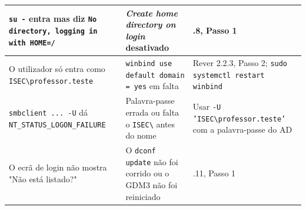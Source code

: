 \begin{center}
\begin{tabularx}{\linewidth}{|>{\raggedright\arraybackslash}X|>{\raggedright\arraybackslash}X|>{\raggedright\arraybackslash}X|}
\hline
\texttt{su -} entra mas diz \texttt{No directory,\allowbreak{} logging in with HOME=/\allowbreak{}} & \emph{Create home directory on login} desativado & 2.2.8, Passo 1 \\
\hline
O utilizador só entra como \texttt{ISEC\textbackslash{}professor.teste} & \texttt{winbind use default domain = yes} em falta & Rever 2.2.3, Passo 2; \texttt{sudo systemctl restart winbind} \\
\hline
\texttt{smbclient ... -U} dá \texttt{NT\_STATUS\_LOGON\_FAILURE} & Palavra-passe errada ou falta o \texttt{ISEC\textbackslash{}} antes do nome & Usar \texttt{-U 'ISEC\textbackslash{}professor.teste'} com a palavra-passe do AD \\
\hline
O ecrã de login não mostra "Não está listado?" & O \texttt{dconf update} não foi corrido ou o GDM3 não foi reiniciado & 2.2.11, Passo 1 \\
\hline
\end{tabularx}
\end{center}

